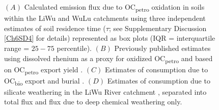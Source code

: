 \begin{figure}[p]
	\caption[Estimates of  source and sink fluxes from various processes in Taiwan]{$(A)$ Calculated  emission flux due to OC\textsubscript{petro} oxidation in soils within the LiWu and WuLu catchments using three independent estimates of soil residence time ($\tau$; see Supplementary Discussion \ref{Ch6SD4} for details) represented as box plots (IQR = interquartile range = $25 - 75$ percentile). $(B)$ Previously published estimates using dissolved rhenium as a proxy for oxidized OC\textsubscript{petro} \citep[orange bars;][]{Hilton:2014dh} and based on OC\textsubscript{petro} export yield \citep[black arrow;][]{Hilton:2011jw}. $(C)$ Estimates of  consumption due to OC\textsubscript{bio} export and burial \citep[mean $\pm 1$ std. dev.;][]{Hilton:2012dt}. $(D)$ Estimates of  consumption due to silicate weathering in the LiWu River catchment \citep{Calmels:2011gv}, separated into total flux and flux due to deep chemical weathering only.}

\end{figure}
